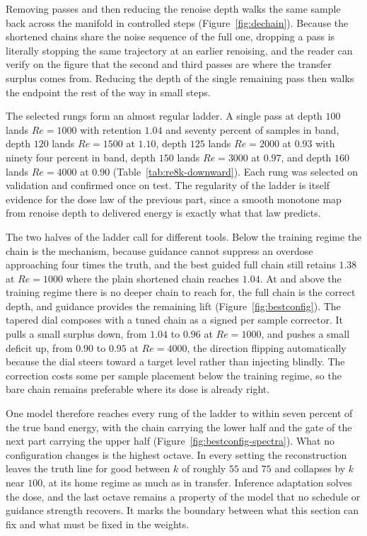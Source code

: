 Removing passes and then reducing the renoise depth walks the same sample back
across the manifold in controlled steps
(Figure~\ref{fig:dechain}). Because the shortened chains share the noise
sequence of the full one, dropping a pass is literally stopping the same
trajectory at an earlier renoising, and the reader can verify on the figure
that the second and third passes are where the transfer surplus comes from.
Reducing the depth of the single remaining pass then walks the endpoint the
rest of the way in small steps.

The selected rungs form an almost regular ladder. A single pass at depth
$100$ lands $Re=1000$ with retention $1.04$ and seventy percent of samples in
band, depth $120$ lands $Re=1500$ at $1.10$, depth $125$ lands $Re=2000$ at
$0.93$ with ninety four percent in band, depth $150$ lands $Re=3000$ at
$0.97$, and depth $160$ lands $Re=4000$ at $0.90$
(Table~\ref{tab:re8k-downward}). Each rung was selected on validation and
confirmed once on test. The regularity of the ladder is itself evidence for
the dose law of the previous part, since a smooth monotone map from renoise
depth to delivered energy is exactly what that law predicts.

The two halves of the ladder call for different tools. Below the training
regime the chain is the mechanism, because guidance cannot suppress an
overdose approaching four times the truth, and the best guided full chain
still retains $1.38$ at $Re=1000$ where the plain shortened chain reaches
$1.04$. At and above the training regime there is no deeper chain to reach
for, the full chain is the correct depth, and guidance provides the remaining
lift (Figure~\ref{fig:bestconfig}). The tapered dial composes with a tuned
chain as a signed per sample corrector. It pulls a small surplus down, from
$1.04$ to $0.96$ at $Re=1000$, and pushes a small deficit up, from $0.90$ to
$0.95$ at $Re=4000$, the direction flipping automatically because the dial
steers toward a target level rather than injecting blindly. The correction
costs some per sample placement below the training regime, so the bare chain
remains preferable where its dose is already right.

One model therefore reaches every rung of the ladder to within seven percent
of the true band energy, with the chain carrying the lower half and the gate
of the next part carrying the upper half
(Figure~\ref{fig:bestconfig-spectra}). What no configuration changes is the
highest octave. In every setting the reconstruction leaves the truth line for
good between $k$ of roughly $55$ and $75$ and collapses by $k$ near $100$, at
its home regime as much as in transfer. Inference adaptation solves the dose,
and the last octave remains a property of the model that no schedule or
guidance strength recovers. It marks the boundary between what this section
can fix and what must be fixed in the weights.


